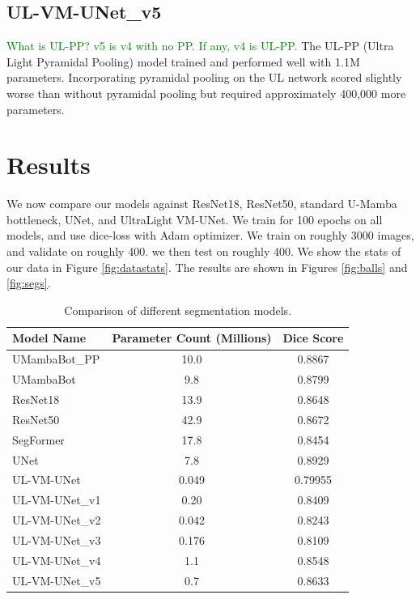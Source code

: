 \documentclass[conference]{IEEEtran}
\newcommand{\gr}[1]{\textcolor{green}{#1}}
\begin{document}
\subsection{UL-VM-UNet\_v5}
\gr{What is UL-PP? v5 is v4 with no PP. If any, v4 is UL-PP.}
The UL-PP (Ultra Light Pyramidal Pooling) model trained and performed well with 1.1M parameters. Incorporating pyramidal pooling on the UL network scored slightly worse than without pyramidal pooling but required approximately 400,000 more parameters.


\section{Results}
We now compare our models against ResNet18, ResNet50, standard U-Mamba bottleneck, UNet, and UltraLight VM-UNet. We train for 100 epochs on all models, and use dice-loss with Adam optimizer. We train on roughly 3000 images, and validate on roughly 400. we then test on roughly 400. We show the stats of our data in Figure \ref{fig:datastats}.
The results are shown in Figures \ref{fig:balls} and \ref{fig:segs}.

\begin{table}[ht]
    \centering
    \begin{tabular}{|l|c|c|}
        \hline
        \textbf{Model Name} & \textbf{Parameter Count (Millions)} & \textbf{Dice Score} \\
        \hline
        UMambaBot\_PP       & 10.0                                & 0.8867              \\
        UMambaBot           & 9.8                                 & 0.8799              \\
        ResNet18            & 13.9                                & 0.8648              \\
        ResNet50            & 42.9                                & 0.8672              \\
        SegFormer           & 17.8                                & 0.8454              \\
        UNet                & 7.8                                 & 0.8929              \\
        UL-VM-UNet          & 0.049                               & 0.79955             \\
        UL-VM-UNet\_v1      & 0.20                                & 0.8409              \\
        UL-VM-UNet\_v2      & 0.042                               & 0.8243              \\
        UL-VM-UNet\_v3      & 0.176                               & 0.8109              \\
        UL-VM-UNet\_v4      & 1.1                                 & 0.8548              \\
        UL-VM-UNet\_v5      & 0.7                                 & 0.8633              \\
        \hline
    \end{tabular}
    \caption{Comparison of different segmentation models.}
    \label{tab:model_comparison}
\end{table}
\end{document}
